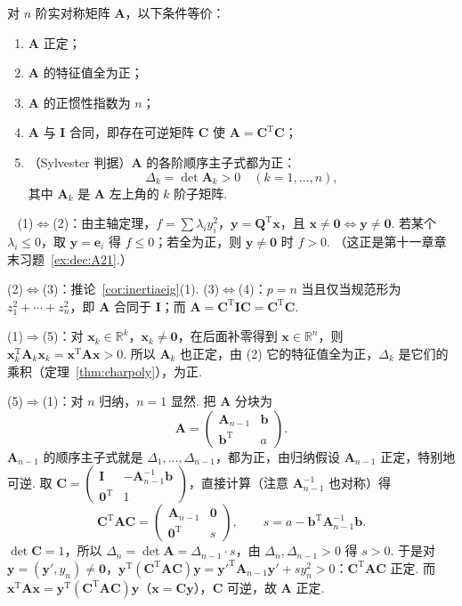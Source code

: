 \documentclass[lang=cn,10.5pt,scheme=chinese,toc=twocol,section,chinesefont=nofont,
twoside,citestyle=gb7714-2015,bibstyle=gb7714-2015]{elegantbook}
\DeclareRobustCommand{\textbf}[1]{{\lnsemiboldlatin\lnsemiboldcjk #1}}
\newcommand{\vv}[1]{\boldsymbol{#1}}
\newcommand{\zero}{\boldsymbol{0}}          %
\newcommand{\trans}{\mathrm{T}}             %
\numberwithin{equation}{section}   %
\newcommand*{\lnlabel}[1]{{\sffamily\bfseries\color{black}#1}}
\renewenvironment{proof}{%
	\par\noindent\lnlabel{\proofname}\;\ \color{black!90}\cfs}{\par}
\begin{document}
\begin{theorem}
  \label{thm:posdef}
  对 $n$ 阶实对称矩阵 $\vv A$，以下条件等价：
  \begin{enumerate}
    \item $\vv A$ 正定；
    \item $\vv A$ 的特征值全为正；
    \item $\vv A$ 的正惯性指数为 $n$；
    \item $\vv A$ 与 $\vv I$ 合同，即存在可逆矩阵 $\vv C$ 使 $\vv A=\vv C^\trans\vv C$；
    \item （Sylvester 判据）$\vv A$ 的各阶\textbf{顺序主子式}都为正：
          \[\Delta_k=\det\vv A_k>0\quad(k=1,\ldots,n),\]
          其中 $\vv A_k$ 是 $\vv A$ 左上角的 $k$ 阶子矩阵.
  \end{enumerate}
\end{theorem}
\begin{proof}
  (1)$\Leftrightarrow$(2)：由主轴定理，$f=\sum\lambda_iy_i^2$，$\vv y=\vv Q^\trans\vv x$，且 $\vv x\ne\zero\iff\vv y\ne\zero$. 若某个 $\lambda_i\le0$，取 $\vv y=\vv e_i$ 得 $f\le0$；若全为正，则 $\vv y\ne\zero$ 时 $f>0$. （这正是第十一章章末习题~\ref{ex:dec:A21}.）

  (2)$\Leftrightarrow$(3)：推论~\ref{cor:inertiaeig}(1). (3)$\Leftrightarrow$(4)：$p=n$ 当且仅当规范形为 $z_1^2+\cdots+z_n^2$，即 $\vv A$ 合同于 $\vv I$；而 $\vv A=\vv C^\trans\vv I\vv C=\vv C^\trans\vv C$.

  (1)$\Rightarrow$(5)：对 $\vv x_k\in\mathbb{R}^k$，$\vv x_k\ne\zero$，在后面补零得到 $\vv x\in\mathbb{R}^n$，则 $\vv x_k^\trans\vv A_k\vv x_k=\vv x^\trans\vv A\vv x>0$. 所以 $\vv A_k$ 也正定，由 (2) 它的特征值全为正，$\Delta_k$ 是它们的乘积（定理~\ref{thm:charpoly}），为正.

  (5)$\Rightarrow$(1)：对 $n$ 归纳，$n=1$ 显然. 把 $\vv A$ 分块为
  \[\vv A=
    \begin{pmatrix}
      \vv A_{n-1} & \vv b \\ \vv b^\trans&a
    \end{pmatrix}
    .\]
  $\vv A_{n-1}$ 的顺序主子式就是 $\Delta_1,\ldots,\Delta_{n-1}$，都为正，由归纳假设 $\vv A_{n-1}$ 正定，特别地可逆. 取 $\vv C=
    \begin{pmatrix}
      \vv I & -\vv A_{n-1}^{-1}\vv b \\ \zero^\trans&1
    \end{pmatrix}
  $，直接计算（注意 $\vv A_{n-1}^{-1}$ 也对称）得
  \[
    \vv C^\trans\vv A\vv C=
    \begin{pmatrix}
      \vv A_{n-1} & \zero \\ \zero^\trans&s
    \end{pmatrix}
    ,\qquad s=a-\vv b^\trans\vv A_{n-1}^{-1}\vv b.
  \]
  $\det\vv C=1$，所以 $\Delta_n=\det\vv A=\Delta_{n-1}\cdot s$，由 $\Delta_n,\Delta_{n-1}>0$ 得 $s>0$. 于是对 $\vv y=(\vv y',y_n)\ne\zero$，$\vv y^\trans(\vv C^\trans\vv A\vv C)\vv y=\vv y'^\trans\vv A_{n-1}\vv y'+sy_n^2>0$：$\vv C^\trans\vv A\vv C$ 正定. 而 $\vv x^\trans\vv A\vv x=\vv y^\trans(\vv C^\trans\vv A\vv C)\vv y$（$\vv x=\vv C\vv y$），$\vv C$ 可逆，故 $\vv A$ 正定.
\end{proof}
\end{document}
